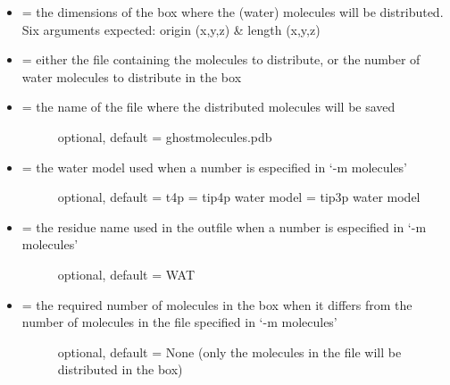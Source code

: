 \documentclass[letterpaper,10pt,english]{sphinxmanual}
\begin{document}
\begin{itemize}
\item {} 
 = the dimensions of the box where the (water) molecules will be distributed. Six arguments expected: origin (x,y,z) \& length (x,y,z)

\item {} 
 = either the file containing the molecules to distribute, or the number of water molecules to distribute in the box

\item {} \begin{description}
\item[{ = the name of the file where the distributed molecules will be saved}] \leavevmode
optional, default = ghostmolecules.pdb

\end{description}

\item {} \begin{description}
\item[{ = the water model used when a number is especified in `-m molecules'}] \leavevmode
optional, default =  t4p
 = tip4p water model
 = tip3p water model

\end{description}

\item {} \begin{description}
\item[{ = the residue name used in the outfile when a number is especified in `-m molecules'}] \leavevmode
optional, default = WAT

\end{description}

\item {} \begin{description}
\item[{ = the required number of molecules in the box when it differs from the number of molecules in the file specified in `-m molecules'}] \leavevmode
optional, default = None (only the molecules in the file will be distributed in the box)

\end{description}

\end{itemize}
\end{document}
